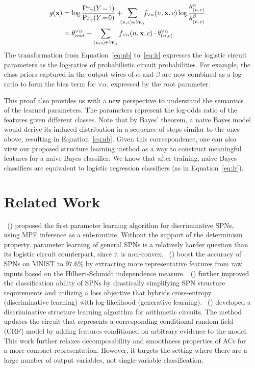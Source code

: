 \documentclass[letterpaper]{article} %
\newcommand{\sample}{{\bf x}}
\newcommand{\citet}[1]{\citeauthor{#1}~(\citeyear{#1})}
\begin{document}
\begin{align}
g(\sample)&= \log\frac{\Pr_\gamma(Y\!=\!1)}{\Pr_\gamma(Y\!=\!0)} + \!\!\!\sum_{(n,c) \in \mathcal{W}_{\alpha}} \!\!  f_{\lor \alpha}(n,\sample,c) \log \frac{\theta^\alpha_{(n,c)}}{\theta^\beta_{(n,c)}}  \label{eq:nb}\\
&=\theta^{\lor \alpha}_{\mathit{root}} + \sum_{(n,c) \in \mathcal{W}_{\alpha}}f_{\lor \alpha}(n,\sample,c) \cdot \theta_{(n,c)}^{\lor \alpha}. \label{eq:lr}
\end{align}
The transformation from Equation~\ref{eq:nb} to~\ref{eq:lr} expresses the logistic circuit parameters as the  log-ratios of probabilistic circuit probabilities.
For example, the class priors captured in the output wires of $\alpha$ and $\beta$ are now combined as a log-ratio to form the bias term for $\lor \alpha$, expressed by the root parameter.

This proof also provides us with a new perspective to understand the semantics of the learned parameters.
The parameters represent the log-odds ratio of the features given different classes. Note that by Bayes' theorem, a naive Bayes model would derive its induced distribution in a sequence of steps similar to the ones above, resulting in Equation~\ref{eq:nb}. Given this correspondence, one can also view our proposed structure learning method as a way to construct meaningful features for a naive Bayes classifier. We know that after training, naive Bayes classifiers are equivalent to logistic regression classifiers (as in Equation~\ref{eq:lr}).



\vspace{-1.61mm}
\section{Related Work}
\citet{gens2012discriminative} proposed the first parameter learning algorithm for discriminative SPNs, using MPE inference as a sub-routine. Without the support of the determinism property, parameter learning of general SPNs is a relatively harder question than its logistic circuit counterpart, since it is non-convex. \citet{adel2015learning} boost the accuracy of SPNs on MNIST to  $97.6\%$ by extracting more representative features from raw inputs based on the Hilbert-Schmidt independence measure.
\citet{rat-spn2018} further improved the  classification ability of SPNs by drastically simplifying SPN structure requirements and utilizing a loss objective that hybrids cross-entropy (discriminative learning) with log-likelihood (generative learning).  \citet{rooshenas2016discriminative} developed a discriminative structure learning algorithm for arithmetic circuits. The method updates the circuit that represents a corresponding conditional random field (CRF) model by adding features conditioned on arbitrary evidence to the model. This work further relaxes decomposability and smoothness properties of ACs for a more compact representation. However, it targets the setting where there are a large number of output variables, not single-variable classification.
\end{document}
